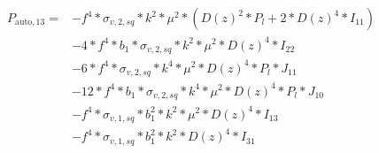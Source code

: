 \documentclass{article}
\begin{document}
\begin{equation}
\begin{aligned}  
P_{\mathrm{auto},13}=
&-f^{4}*\sigma_{v,2,sq}*k^{2}*\mu^{2}*(D(z)^{2}*P_l + 2*D(z)^{4}*I_{11}) \\
&-4*f^{4}*b_{1}*\sigma_{v,2,sq}*k^{2}*\mu^{2}*D(z)^{4}*I_{22} \\
&-6*f^{4}*\sigma_{v,2,sq}*k^{4}*\mu^{2}*D(z)^{4}*P_l*J_{11} \\
&-12*f^{4}*b_{1}*\sigma_{v,2,sq}*k^{4}*\mu^{2}*D(z)^{4}*P_l*J_{10} \\
&-f^{4}*\sigma_{v,1,sq}*b_{1}^{2}*k^{2}*\mu^{2}*D(z)^{4}*I_{13} \\
&-f^{4}*\sigma_{v,1,sq}*b_{1}^{2}*k^{2}*D(z)^{4}*I_{31} \\
\end{aligned}
\end{equation}
\end{document}
